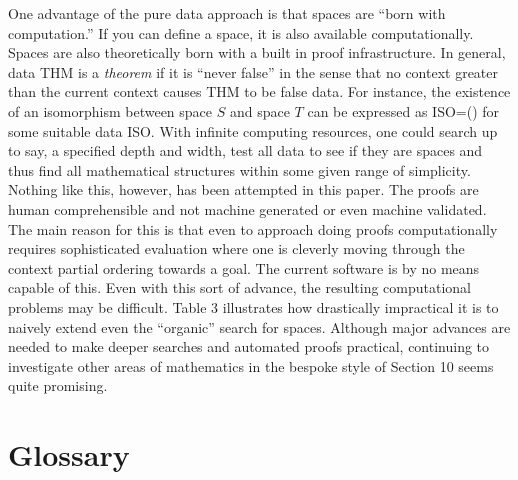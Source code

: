 \documentclass[11pt]{article}
\begin{document}
      One advantage of the pure data approach is that spaces are ``born with computation.''  If you can define a space, it is also 
available computationally.  Spaces are also theoretically born with a built in proof infrastructure.  In general, data THM is 
a {\it theorem} if it is ``never false'' in the sense that no context greater than the current context causes THM to be false data.  
For instance,  the existence of an isomorphism between space $S$ and space $T$ can be expressed as ISO=() for some 
suitable data ISO.  With infinite computing resources, one could search up to say, a specified depth and width, test all data to see if they are 
spaces and thus find all mathematical structures within some given range of simplicity.  Nothing like this, however, has been attempted 
in this paper.  The proofs are human comprehensible and not machine generated or even machine validated.  The main reason for this
is that even to approach doing proofs computationally requires sophisticated evaluation where one is cleverly moving through the context 
partial ordering towards a goal.  The current software \cite{Software} is by no means capable of this.  Even with this sort of advance, 
the resulting computational problems may be difficult.  Table 3 illustrates how drastically impractical it is to naively extend even the 
``organic'' search for spaces.  Although major advances are needed to make deeper searches and automated proofs practical, 
continuing to investigate other areas of mathematics in the bespoke style of Section 10 seems quite promising.  

\section{Glossary}
\end{document}
